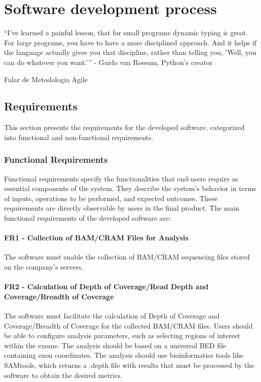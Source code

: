 \chapter{Software development process}
\label{chapter:Analysis tool}

\begin{introduction}
    “I've learned a painful lesson, that for small programs dynamic typing is great. For large programs, you have to have a more disciplined approach. And it helps if the language actually gives you that discipline, rather than telling you, 'Well, you can do whatever you want.'” - Guido van Rossum, Python's creator
\end{introduction}

Falar de Metodologia Agile

\section{Requirements}

This section presents the requirements for the developed software, categorized into functional and non-functional requirements. 
\subsection{Functional Requirements}

Functional requirements specify the functionalities that end-users require as essential components of the system. They describe the system's behavior in terms of inputs, operations to be performed, and expected outcomes. These requirements are directly observable by users in the final product. \cite{Geeks2024} The main functional requirements of the developed software are:

\subsubsection{\textbf{FR1 - Collection of BAM/CRAM Files for Analysis}}

The software must enable the collection of BAM/CRAM sequencing files stored on the company's servers.

\subsubsection{\textbf{FR2 - Calculation of Depth of Coverage/Read Depth and Coverage/Breadth of Coverage}}

The software must facilitate the calculation of Depth of Coverage and Coverage/Breadth of Coverage for the collected BAM/CRAM files. Users should be able to configure analysis parameters, such as selecting regions of interest within the exome. The analysis should be based on a universal BED file containing exon coordinates. The analysis should use bioinformatics tools like SAMtools, which returns a .depth file with results that must be processed by the software to obtain the desired metrics.

